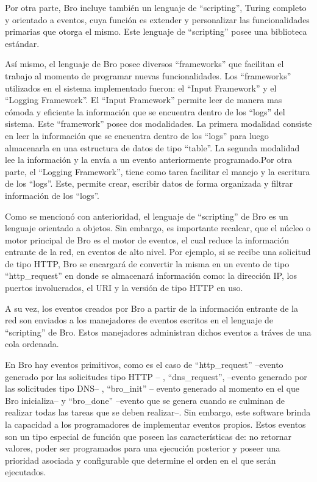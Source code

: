 Por otra parte, Bro incluye también un lenguaje de ``scripting'', Turing completo y orientado a eventos, cuya función es extender y personalizar las funcionalidades primarias que otorga el mismo. Este lenguaje de ``scripting'' posee una biblioteca estándar. 

Así mismo, el lenguaje de Bro posee diversos ``frameworks'' que facilitan el trabajo al momento de programar nuevas funcionalidades. Los ``frameworks'' utilizados en el sistema implementado fueron: el ``Input Framework'' y el ``Logging Framework''. El ``Input Framework'' permite leer de manera mas cómoda y eficiente la información que se encuentra dentro de los ``logs'' del sistema. Este ``framework'' posee dos modalidades. La primera modalidad consiste en leer la información que se encuentra dentro de los ``logs'' para luego almacenarla en una estructura de datos de tipo ``table''. La segunda modalidad lee la información y la envía a un evento anteriormente programado.Por otra parte, el ``Logging Framework'', tiene como tarea facilitar el manejo y la escritura de los ``logs''. Este, permite crear, escribir datos de forma organizada y filtrar información de los ``logs''.

Como se mencionó con anterioridad, el lenguaje de ``scripting'' de Bro es un lenguaje orientado a objetos. Sin embargo, es importante recalcar, que el núcleo o motor principal de Bro es el motor de eventos, el cual reduce la información entrante de la red, en eventos de alto nivel. Por ejemplo, si se recibe una solicitud de tipo HTTP, Bro se encargará de convertir la misma en un evento de tipo ``http\_request'' en donde se almacenará información como: la dirección IP, los puertos involucrados, el URI y la versión de tipo HTTP en uso.

A su vez, los eventos creados por Bro a partir de la información entrante de la red son enviados a los manejadores de eventos escritos en el lenguaje de ``scripting'' de Bro. Estos manejadores administran dichos eventos a tráves de una cola ordenada.

En Bro hay eventos primitivos, como es el caso de ``http\_request''  --evento generado por las solicitudes tipo HTTP -- , ``dns\_request'', --evento generado por las solicitudes tipo DNS-- , ``bro\_init'' -- evento generado al momento en el que Bro inicializa-- y ``bro\_done'' --evento que se genera cuando se culminan de realizar todas las tareas que se deben realizar--. Sin embargo, este software brinda la capacidad a los programadores de implementar eventos propios. Estos eventos son un tipo especial de función que poseen las características de: no retornar valores, poder ser programados para una ejecución posterior y poseer una prioridad asociada y configurable que determine el orden en el que serán ejecutados.

